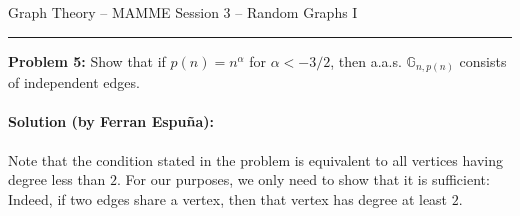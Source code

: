 \documentclass{amsart}
\theoremstyle{plain}
\theoremstyle{definition}
\begin{document}
    {\Large Graph Theory -- MAMME}
    {\Large Session 3 -- Random Graphs I}

    \vspace{0.5cm}

    \hrule

    \vspace{0.5cm}

    \noindent \textbf{Problem 5:}
    Show that if $p(n) = n^{\alpha}$ for $\alpha < -3/2$, then
    a.a.s. $\mathbb{G}_{n, p(n)}$ consists of independent edges.


    \paragraph{\textbf{Solution (by Ferran Espuña):}}
    Note that the condition stated in the problem is equivalent to
    all vertices having degree less than $2$.
    For our purposes, we only need to show that it is sufficient:
    Indeed, if two edges share a vertex, then that vertex has degree at least $2$.
\end{document}
